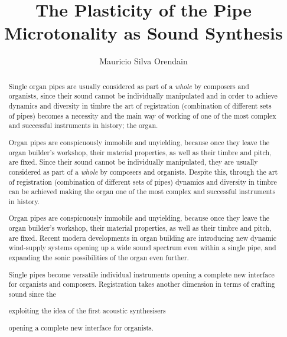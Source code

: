 \documentclass[11pt, oneside]{report}
\title{The Plasticity of the Pipe \\
  \large Microtonality as Sound Synthesis \\
    }
\author{Mauricio Silva Orendain}
\begin{document}
\maketitle

\begin{abstract}

Single organ pipes are usually considered as part of a \textit{whole} by composers and organists, since their sound cannot be individually manipulated and in order to achieve dynamics and diversity in timbre the art of registration (combination of different sets of pipes) becomes a necessity and the main way of working of one of the most complex and successful instruments in history; the organ. 

Organ pipes are conspicuously immobile and unyielding, because once they leave the organ builder's workshop, their material properties, as well as their timbre and pitch, are fixed. Since their sound cannot be individually manipulated, they are usually considered as part of a \textit{whole} by composers and organists. Despite this, through the art of registration (combination of different sets of pipes) dynamics and diversity in timbre can be achieved making the organ one of the most complex and successful instruments in history. 

Organ pipes are conspicuously immobile and unyielding, because once they leave the organ builder's workshop, their material properties, as well as their timbre and pitch, are fixed. Recent modern developments in organ building are introducing new dynamic wind-supply systems opening up a wide sound spectrum even within a single pipe, and expanding the sonic possibilities of the organ even further. 

Single pipes become versatile individual instruments opening a complete new interface for organists and composers. Registration takes another dimension in terms of crafting sound since the 



exploiting the idea of the first acoustic synthesisers 

 opening a complete new interface for organists. 





\end{abstract}
\end{document}
